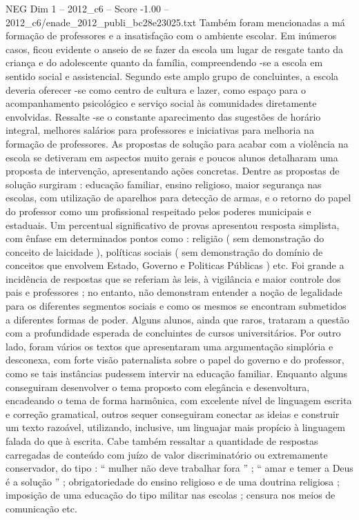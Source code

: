 \begin{textsample}{NEG Dim 1 – 2012\_c6 – Score -1.00 – 2012\_c6/enade\_2012\_publi\_bc28e23025.txt}
Também foram mencionadas a má formação de professores e a insatisfação com o ambiente escolar.
Em inúmeros casos, ficou evidente o anseio de se fazer da escola um lugar de resgate tanto da criança e do adolescente quanto da família, compreendendo -se a escola em sentido social e assistencial.
Segundo este amplo grupo de concluintes, a escola deveria oferecer -se como centro de cultura e lazer, como espaço para o acompanhamento psicológico e serviço social às comunidades diretamente envolvidas.
Ressalte -se o constante aparecimento das sugestões de horário integral, melhores salários para professores e iniciativas para melhoria na formação de professores.
As propostas de solução para acabar com a violência na escola se detiveram em aspectos muito gerais e poucos alunos detalharam uma proposta de intervenção, apresentando ações concretas.
Dentre as propostas de solução surgiram : educação familiar, ensino religioso, maior segurança nas escolas, com utilização de aparelhos para detecção de armas, e o retorno do papel do professor como um profissional respeitado pelos poderes municipais e estaduais.
Um percentual significativo de provas apresentou resposta simplista, com ênfase em determinados pontos como : religião ( sem demonstração do conceito de laicidade ), políticas sociais ( sem demonstração do domínio de conceitos que envolvem Estado, Governo e Politicas Públicas ) etc.
Foi grande a incidência de respostas que se referiam às leis, à vigilância e maior controle dos pais e professores ; no entanto, não demonstram entender a noção de legalidade para os diferentes segmentos sociais e como os mesmos se encontram submetidos a diferentes formas de poder.
Alguns alunos, ainda que raros, trataram a questão com a profundidade esperada de concluintes de cursos universitários.
Por outro lado, foram vários os textos que apresentaram uma argumentação simplória e desconexa, com forte visão paternalista sobre o papel do governo e do professor, como se tais instâncias pudessem intervir na educação familiar.
Enquanto alguns conseguiram desenvolver o tema proposto com elegância e desenvoltura, encadeando o tema de forma harmônica, com excelente nível de linguagem escrita e correção gramatical, outros sequer conseguiram conectar as ideias e construir um texto razoável, utilizando, inclusive, um linguajar mais propício à linguagem falada do que à escrita.
Cabe também ressaltar a quantidade de respostas carregadas de conteúdo com juízo de valor discriminatório ou extremamente conservador, do tipo : “ mulher não deve trabalhar fora ” ; “ amar e temer a Deus é a solução ” ; obrigatoriedade do ensino religioso e de uma doutrina religiosa ; imposição de uma educação do tipo militar nas escolas ; censura nos meios de comunicação etc.

\end{textsample}

